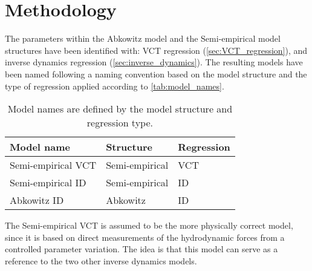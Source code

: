 \section{Methodology}
\label{sec:methodology}
The parameters within the Abkowitz model and the Semi-empirical model structures have been identified with: VCT regression (\autoref{sec:VCT_regression}), and inverse dynamics regression (\autoref{sec:inverse_dynamics}). The resulting models have been named following a  naming convention based on the model structure and the type of regression applied according to \autoref{tab:model_names}.
\begin{table}[h!]
    \caption{Model names are defined by the model structure and regression type.}
    \label{tab:model_names}
    \centering
    \begin{tabular}{l l l}
        Model name & Structure & Regression \\
        \hline
        Semi-empirical VCT & Semi-empirical & VCT \\
        Semi-empirical ID & Semi-empirical & ID \\
        Abkowitz ID & Abkowitz & ID \\
    \end{tabular}
\end{table}
The Semi-empirical VCT is assumed to be the more physically correct model, since it is based on direct measurements of the hydrodynamic forces from a controlled parameter variation. The idea is that this model can serve as a reference to the two other inverse dynamics models.

